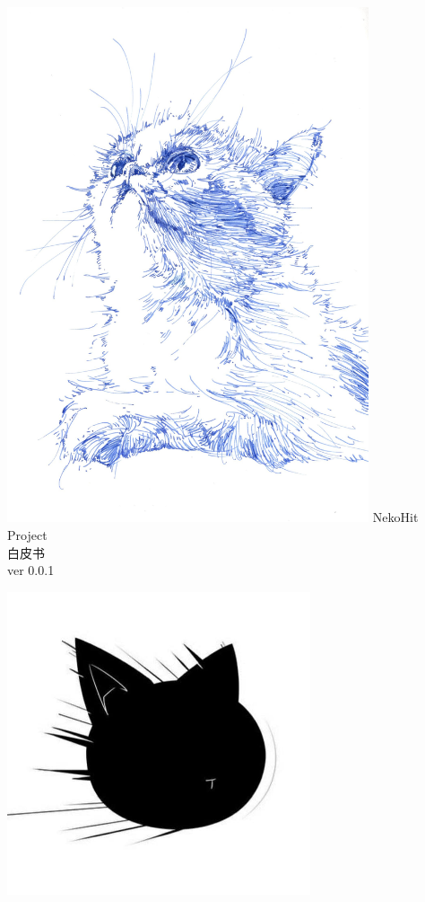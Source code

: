\documentclass[11pt,UTF8,a4paper]{ctexart}
\begin{document}
    \begin{titlepage}
        \centering
        \vfill
        \includegraphics[width=0.8\textwidth]{assets/img196}
        \vfill
        {\Huge
        \textsf{NekoHit Project}\\
        白皮书\\
        \vskip2cm
        \vfill
        \Large
        ver 0.0.1
        }
        \vfill
        \vfill
    \end{titlepage}
    \tableofcontents
    \vspace*{\fill}
    \begin{center}
        \includegraphics[width=0.67\textwidth]{assets/img197}
    \end{center}
    \clearpage
\end{document}
